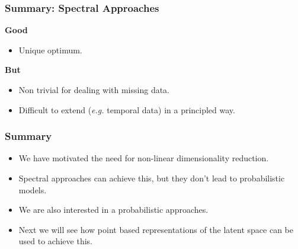 

\begin{frame}
  \frametitle{Summary: Spectral Approaches}

  \textbf{Good}
  \begin{itemize}
  \item Unique optimum.
  \end{itemize}
  \textbf{But}
  \begin{itemize}
  \item Non trivial for dealing with missing data.
  \item Difficult to extend (\emph{e.g.} temporal data) in a
    principled way.
  \end{itemize}
\end{frame}

\begin{frame}
  \frametitle{Summary}
  \begin{itemize}
  \item We have motivated the need for non-linear dimensionality
    reduction.
  \item Spectral approaches can achieve this, but they don't lead to
    probabilistic models.
  \item We are also interested in a probabilistic approaches.
  \item Next we will see how point based representations of the latent
    space can be used to achieve this.
  \end{itemize}

\end{frame}
